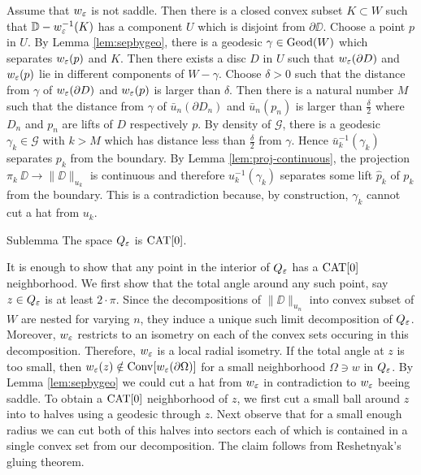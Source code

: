 \documentclass{article}
\begin{document}
Assume that $w_\varepsilon$ is not saddle.
Then there is a closed convex subset $K\subset W$ such that $\mathbb{D}-w_\varepsilon^{-1}(K)$
has a component $U$ which is disjoint from $\partial \DD$.
Choose a point $p$ in $U$.
By Lemma \ref{lem:sepbygeo}, there is  
a geodesic $\gamma\in\mathop{\rm Geod}\nolimits(W)$ which separates $w_\varepsilon(p)$ and $K$.
Then there exists a disc $D$ in $U$ such that
$w_\varepsilon(\partial D)$ and $w_\varepsilon(p)$ lie in different components of $W-\gamma$. 
Choose $\delta>0$ 
such that the distance from $\gamma$ of $w_\varepsilon(\partial D)$ and $w_\varepsilon(p)$ is larger than $\delta$.
Then there is a natural number $M$ such that the distance from $\gamma$ of $\bar u_n(\partial D_n)$ and $\bar u_n(p_n)$ is larger than $\frac{\delta}{2}$
where $D_n$ and $p_n$ are lifts of $D$ respectively $p$.
By density of $\mathcal{G}$, there is a geodesic $\gamma_k\in \mathcal{G}$ with $k>M$ which has distance less than $\frac{\delta}{2}$ from $\gamma$. 
Hence $\bar u_k^{-1}(\gamma_k)$ separates $p_k$ from the boundary. 
By Lemma \ref{lem:proj-continuous}, the projection $\pi_k\:\DD\to \|\DD\|_{u_k}$ is continuous
and therefore $u_k^{-1}(\gamma_k)$ separates some lift $\hat p_k$ of $p_k$ from the boundary.
This is a contradiction because, by construction, $\gamma_k$ cannot cut a hat from $u_k$.
\qeds

\begin{thm}{Sublemma}
The space $Q_\varepsilon$ is $\mathop{\rm CAT}\nolimits[0]$. 
\end{thm}

It is enough to show that any point in the interior of $Q_\varepsilon$ has a $\mathop{\rm CAT}\nolimits[0]$ neighborhood.
We first show that the total angle around any such point, say $z\in Q_\varepsilon$ is at least $2\cdot\pi$.
Since the decompositions of $\|\DD\|_{u_n}$ into convex subset of $W$ are nested for varying $n$, they
induce a unique such limit decomposition of $Q_\varepsilon$.
Moreover, $w_\varepsilon$ restricts to an isometry on each 
of the convex sets occuring in this decomposition.
Therefore, $w_\varepsilon$ is a local radial isometry.
If the total angle at $z$ is too small, then $w_\varepsilon(z)\notin\mathop{\rm Conv}\nolimits [w_\varepsilon (\partial\Omega)]$
for a small neighborhood $\Omega\ni w$ in $Q_\varepsilon$. 
By Lemma \ref{lem:sepbygeo} we could cut a hat from $w_\varepsilon$
in contradiction to $w_\varepsilon$ beeing saddle.
To obtain a $\mathop{\rm CAT}\nolimits[0]$ neighborhood of $z$, we first cut a small ball around $z$ into to halves using a geodesic through $z$.
Next observe that for a small enough radius we can cut both of this halves into sectors each of which is contained in a single convex set
from our decomposition.
The claim follows from Reshetnyak's gluing theorem.
\qeds
\end{document}
